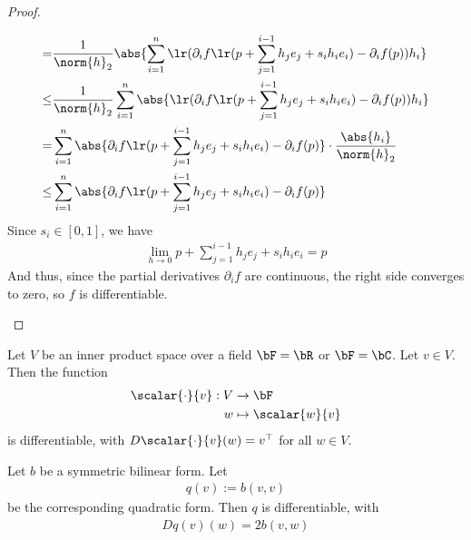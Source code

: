 \begin{proof}
\begin{enumerate}
\begin{align*}
			=
			&\frac{1}{\norm{h}_2}
			\abs{\sum_{i = 1}^n \lr(\partial_i f\lr(p + \sum_{j = 1}^{i-1} h_je_j + s_ih_ie_i) - \partial_i f(p)) h_i}\\
			\leq
			&\frac{1}{\norm{h}_2}
			\sum_{i = 1}^n \abs{\lr(\partial_i f\lr(p + \sum_{j = 1}^{i-1} h_je_j + s_ih_ie_i) - \partial_i f(p)) h_i}\\
			=
			&
			\sum_{i = 1}^n \abs{\partial_i f\lr(p + \sum_{j = 1}^{i-1} h_je_j + s_ih_ie_i) - \partial_i f(p)} \cdot \frac{\abs{h_i}}{\norm{h}_2}\\
			\leq
			&
			\sum_{i = 1}^n \abs{\partial_i f\lr(p + \sum_{j = 1}^{i-1} h_je_j + s_ih_ie_i) - \partial_i f(p)}
		\end{align*}
		Since $s_i \in [0,1]$, we have
		\begin{align*}
			\lim_{h \to 0} p + \sum_{j = 1}^{i-1} h_je_j + s_ih_ie_i = p
		\end{align*}
		And thus, since the partial derivatives $\partial_i f$ are continuous, the right side converges to zero, so $f$ is differentiable.
	\end{enumerate}
\end{proof}
\begin{exercise}
	Let $V$ be an inner product space over a field $\bF = \bR$ or $\bF = \bC$. Let $v \in V$. Then the function 
	\begin{align*}
		\scalar{\cdot}{v} : V &\to \bF\\
		w &\mapsto \scalar{w}{v}
	\end{align*}
	is differentiable, with $D\scalar{\cdot}{v}(w) = v^\top$ for all $w \in V$.
\end{exercise}
\begin{exercise}
	Let $b$ be a symmetric bilinear form. Let
	\begin{align*}
		q(v) := b(v,v)
	\end{align*}
	be the corresponding quadratic form. Then
	$q$ is differentiable, with
	\begin{align*}
		Dq(v)(w) = 2b(v,w)
	\end{align*}
\end{exercise}
\clearpage

